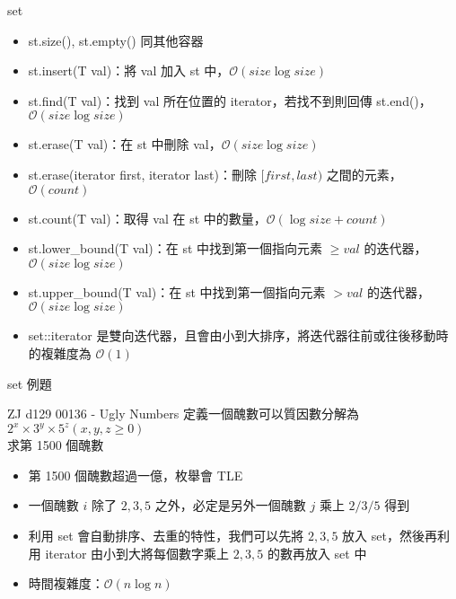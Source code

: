 \documentclass[aspectratio=169]{beamer}
\begin{document}
    \begin{frame}{set}
        \begin{itemize}
            \item<1-> st.size(), st.empty() 同其他容器
            \item<2-> st.insert(T val)：將 val 加入 st 中，$\mathcal{O}(size \log size)$
            \item<3-> st.find(T val)：找到 val 所在位置的 iterator，若找不到則回傳 st.end()，$\mathcal{O}(size \log size)$
            \item<3-> st.erase(T val)：在 st 中刪除 val，$\mathcal{O}(size \log size)$
            \item<4-> st.erase(iterator first, iterator last)：刪除 $[first, last)$ 之間的元素，$\mathcal{O}(count)$
            \item<5-> st.count(T val)：取得 val 在 st 中的數量，$\mathcal{O}(\log size + count)$
            \item<6-> st.lower\_bound(T val)：在 st 中找到第一個指向元素 $\ge val$ 的迭代器，$\mathcal{O}(size \log size)$
            \item<6-> st.upper\_bound(T val)：在 st 中找到第一個指向元素 $> val$ 的迭代器，$\mathcal{O}(size \log size)$
            \item<7-> set::iterator 是雙向迭代器，且會由小到大排序，將迭代器往前或往後移動時的複雜度為 $\mathcal{O}(1)$
        \end{itemize}
    \end{frame}

    \begin{frame}{set 例題}
        \begin{block}{ZJ d129 00136 - Ugly Numbers}
            定義一個醜數可以質因數分解為 $2^x \times 3^y \times 5^z (x, y, z \ge 0)$\\
            求第 1500 個醜數
        \end{block}

        \begin{itemize}
            \item<2-> 第 1500 個醜數超過一億，枚舉會 TLE
            \item<3-> 一個醜數 $i$ 除了 $2, 3, 5$ 之外，必定是另外一個醜數 $j$ 乘上 $2/3/5$ 得到
            \item<4-> 利用 set 會自動排序、去重的特性，我們可以先將 $2, 3, 5$ 放入 set，然後再利用 iterator 由小到大將每個數字乘上 $2, 3, 5$ 的數再放入 set 中
            \item<5-> 時間複雜度：$\mathcal{O}(n\log n)$
        \end{itemize}
    \end{frame}
\end{document}

